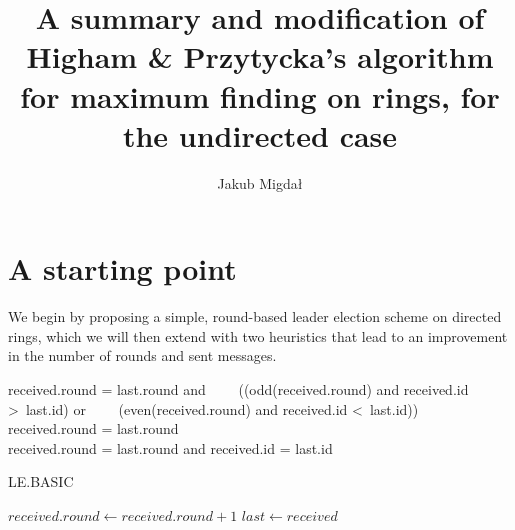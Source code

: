 \documentclass{article}
\title{A summary and modification of Higham \& Przytycka's algorithm for maximum finding on rings, for the undirected case}
\author{Jakub Migdał}
\date{}
\begin{document}
\maketitle

\section{A starting point}
We begin by proposing a simple, round-based leader election scheme on directed rings, which we will then extend with two heuristics that lead to an improvement in the number of rounds and sent messages.
\\
\begin{algorithmic}
    \State \Return received.round = last.round and
    \State \ \ \ \ ((odd(received.round) and received.id \textgreater \ last.id) or
    \State \ \ \ \  (even(received.round) and received.id \textless   \ last.id))
\EndFunction
\\

    \State \Return received.round = last.round
\EndFunction
\\

    \State \Return received.round = last.round and received.id = last.id
\EndFunction
\\
\end{algorithmic}

\begin{algorithm}[H]
\caption{LE.BASIC}
\begin{algorithmic}
\Repeat
            \State $received.round \gets received.round+1$
        \EndIf
        \State $last \gets received$
        \State {}
    \EndIf
\Until {}
\end{algorithmic}
\end{algorithm}
\end{document}
